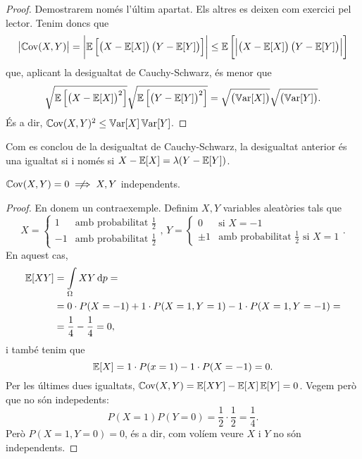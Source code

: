 \begin{proof}
    Demostrarem nom\'es l'últim apartat. Els altres es deixen com exercici pel lector.
    Tenim doncs que
    \[
        \left|\operatorname{\mathbb{C}ov}(X, Y)\right| = 
        \left|\operatorname{\mathbb{E}}\left[\left( X - \operatorname{\mathbb{E}}[X] \right) \left( Y- \operatorname{\mathbb{E}}[Y]\right)\right]\right| 
        \leq \operatorname{\mathbb{E}}\left[\left|\left( X - \operatorname{\mathbb{E}}[X] \right) \left( Y- \operatorname{\mathbb{E}}[Y]\right)\right|\right]
    \]
    que, aplicant la desigualtat de Cauchy-Schwarz, \'es menor que
    \[
        \sqrt{\operatorname{\mathbb{E}} \left[ \left( X - \operatorname{\mathbb{E}}[X] \right)^2\right]} 
        \sqrt{\operatorname{\mathbb{E}} \left[ \left( Y - \operatorname{\mathbb{E}}[Y] \right)^2\right]}
        = \sqrt{\left(\operatorname{\mathbb{V}ar}[X]\right)} \sqrt{\left( \operatorname{\mathbb{V}ar}[Y] \right)}.
    \]
    \'Es a dir, $\operatorname{\mathbb{C}ov}(X, Y)^2 \leq \operatorname{\mathbb{V}ar}[X] \operatorname{\mathbb{V}ar}[Y]$.
\end{proof}

\begin{obs}
    Com es conclou de la desigualtat de Cauchy-Schwarz, la desigualtat anterior \'es una
    igualtat si i nom\'es si $X - \operatorname{\mathbb{E}}[X] = \lambda (Y - \operatorname{\mathbb{E}}[Y])$.
\end{obs}

\begin{obs}
    $\cov(X, Y) = 0 \centernot \implies X,Y$ independents.
\end{obs}

\begin{proof}
    En donem un contraexemple. Definim $X, Y$ variables aleatòries tals que
    \[
        X = 
        \begin{cases}
            1 &\text{amb probabilitat } \frac{1}{2}\\
            -1 &\text{amb probabilitat } \frac{1}{2} 
        \end{cases}, \,
        Y =
        \begin{cases}
            0 &\text{si } X = -1 \\
            \pm 1 &\text{amb probabilitat } \frac{1}{2} \text{ si } X = 1
        \end{cases}.
    \]
    En aquest cas,
    \begin{align*}
        \esp[XY] &= \int\limits_{\Omega} XY \dif p = \\
        &= 0 \cdot P(X = -1) + 1 \cdot 
        P(X = 1, Y = 1) - 1 \cdot P(X= 1, Y= -1) = \\
        &= \frac{1}{4} - \frac{1}{4} = 0,
    \end{align*}
    i tamb\'e tenim que
    \[
        \operatorname{\mathbb{E}}[X] = 1\cdot P(x = 1) - 1 \cdot P(X = -1) = 0. 
    \]
    Per les últimes dues igualtats, $\operatorname{\mathbb{C}ov}(X, Y) = \operatorname{\mathbb{E}}[XY] - \operatorname{\mathbb{E}}[X]\operatorname{\mathbb{E}}[Y] = 0$. Vegem
    però que no són indepedents:
    \[
        P(X = 1)P(Y = 0) = \frac{1}{2} \cdot \frac{1}{2} = \frac{1}{4}.
    \]
    Però $P(X = 1, Y = 0) = 0$, \'es a dir, com volíem veure $X$ i $Y$ no són independents.
\end{proof}


